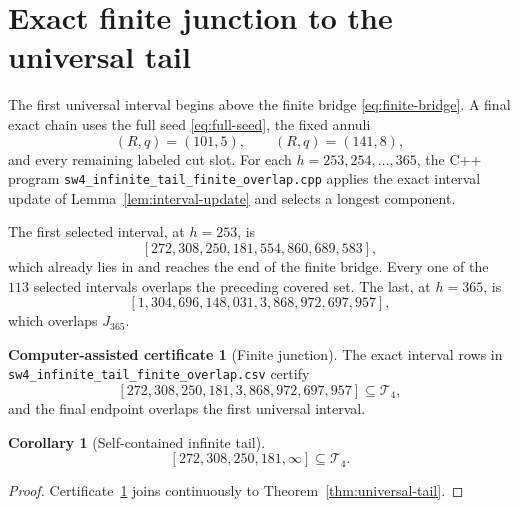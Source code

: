 \documentclass[11pt]{article}
\newtheorem{corollary}[theorem]{Corollary}
\theoremstyle{definition}
\newtheorem{certificate}[theorem]{Computer-assisted certificate}
\theoremstyle{remark}
\newcommand{\Tfour}{\mathcal T_4}
\newcommand{\interval}[2]{\left[#1,#2\right]}
\newcommand{\code}[1]{\nolinkurl{#1}}
\begin{document}
\section{Exact finite junction to the universal tail}

The first universal interval begins above the finite bridge
\eqref{eq:finite-bridge}.  A final exact chain uses the full seed
\eqref{eq:full-seed}, the fixed annuli
\begin{equation}\label{eq:fixed-tail-annuli}
  (R,q)=(101,5),
  \qquad
  (R,q)=(141,8),
\end{equation}
and every remaining labeled cut slot.
For each $h=253,254,\ldots,365$, the C++ program
\code{sw4_infinite_tail_finite_overlap.cpp} applies the exact interval
update of Lemma~\ref{lem:interval-update} and selects a longest component.

The first selected interval, at $h=253$, is
\begin{equation}\label{eq:tail-junction-first}
  [272{,}308{,}250{,}181,
   554{,}860{,}689{,}583],
\end{equation}
which already lies in and reaches the end of the finite bridge.  Every one of
the $113$ selected intervals overlaps the preceding covered set.  The last,
at $h=365$, is
\begin{equation}\label{eq:tail-junction-last}
  [1{,}304{,}696{,}148{,}031,
   3{,}868{,}972{,}697{,}957],
\end{equation}
which overlaps $J_{365}$.

\begin{certificate}[Finite junction]\label{cert:tail-junction}
The exact interval rows in
\code{sw4_infinite_tail_finite_overlap.csv} certify
\[
  \interval{272{,}308{,}250{,}181}
           {3{,}868{,}972{,}697{,}957}
  \subseteq\Tfour,
\]
and the final endpoint overlaps the first universal interval.
\end{certificate}

\begin{corollary}[Self-contained infinite tail]\label{cor:infinite-tail}
\begin{equation}\label{eq:tail-final}
  \boxed{
  \interval{272{,}308{,}250{,}181}{\infty}
  \subseteq\Tfour.}
\end{equation}
\end{corollary}

\begin{proof}
Certificate~\ref{cert:tail-junction} joins continuously to
Theorem~\ref{thm:universal-tail}.
\end{proof}
\end{document}
